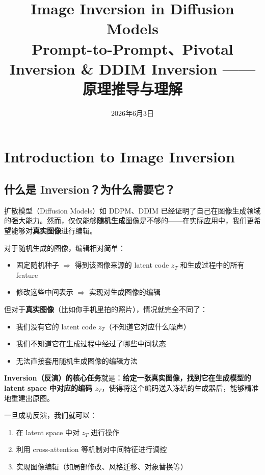 \documentclass[11pt,a4paper]{article}
\title{\Huge Image Inversion in Diffusion Models\\[0.3cm]
       \large Prompt-to-Prompt、Pivotal Inversion \& DDIM Inversion —— 原理推导与理解}
\author{}
\date{2026年6月3日}
\theoremstyle{definition}
\begin{document}
\maketitle
\tableofcontents
\newpage

\section{Introduction to Image Inversion}

\subsection{什么是 Inversion？为什么需要它？}

扩散模型（Diffusion Models）如 DDPM、DDIM 已经证明了自己在图像生成领域的强大能力。然而，仅仅能够\textbf{随机生成}图像是不够的——在实际应用中，我们更希望能够对\textbf{真实图像}进行编辑。

对于随机生成的图像，编辑相对简单：
\begin{itemize}
    \item 固定随机种子 $\Rightarrow$ 得到该图像来源的 latent code $z_T$ 和生成过程中的所有 feature
    \item 修改这些中间表示 $\Rightarrow$ 实现对生成图像的编辑
\end{itemize}

但对于\textbf{真实图像}（比如你手机里拍的照片），情况就完全不同了：
\begin{itemize}
    \item 我们没有它的 latent code $z_T$（不知道它对应什么噪声）
    \item 我们不知道它在生成过程中经过了哪些中间状态
    \item 无法直接套用随机生成图像的编辑方法
\end{itemize}

\textbf{Inversion（反演）的核心任务}就是：\textbf{给定一张真实图像，找到它在生成模型的 latent space 中对应的编码 $z_T$}，使得将这个编码送入冻结的生成器后，能够精准地重建出原图。

一旦成功反演，我们就可以：
\begin{enumerate}
    \item 在 latent space 中对 $z_T$ 进行操作
    \item 利用 cross-attention 等机制对中间特征进行调控
    \item 实现图像编辑（如局部修改、风格迁移、对象替换等）
\end{enumerate}
\end{document}
